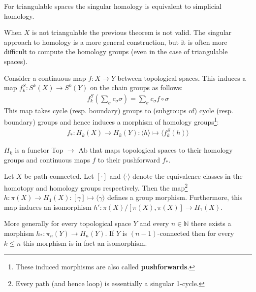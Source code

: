 	
	\begin{theorem}
		For triangulable spaces the singular homology is equivalent to simplicial homology.
	\end{theorem}
	\begin{remark}
		When $X$ is not triangulable the previous theorem is not valid. The singular approach to homology is a more general construction, but it is often more difficult to compute the homology groups (even in the case of triangulable spaces).
	\end{remark}
	
	\begin{property}
		Consider a continuous map $f:X\rightarrow Y$ between topological spaces. This induces a map $f_k^S:S^k(X)\rightarrow S^k(Y)$ on the chain groups as follows:
		\begin{gather}
			f_k^S\left(\sum_\sigma c_\sigma\sigma\right) = \sum_\sigma c_\sigma f\circ\sigma
		\end{gather}
		This map takes cycle (resp. boundary) groups to (subgroups of) cycle (resp. boundary) groups and hence induces a morphism of homology groups\footnote{These induced morphisms are also called \textbf{pushforwards}.}:
		\begin{gather}
			f_\ast:H_k(X)\rightarrow H_k(Y):\langle h \rangle\mapsto \langle f_k^S(h) \rangle
		\end{gather}
	\end{property}
	\begin{result}
		$H_k$ is a functor Top $\rightarrow$ Ab that maps topological spaces to their homology groups and continuous maps $f$ to their pushforward $f_\ast$.
	\end{result}
	
	\begin{theorem}[Hurewicz]
		Let $X$ be path-connected. Let $[\cdot]$ and $\langle\cdot\rangle$ denote the equivalence classes in the homotopy and homology groups respectively. Then the map\footnote{Every path (and hence loop) is essentially a singular 1-cycle.} $h:\pi(X)\rightarrow H_1(X):[\gamma]\mapsto\langle\gamma\rangle$ defines a group morphism. Furthermore, this map induces an isomorphism $h':\pi(X)/[\pi(X), \pi(X)]\rightarrow H_1(X)$.
		
		More generally for every topological space $Y$ and every $n\in\mathbb{N}$ there exists a morphism $h_*:\pi_n(Y)\rightarrow H_n(Y)$. If $Y$ is $(n-1)$-connected then for every $k\leq n$ this morphism is in fact an isomorphism.
	\end{theorem}
	
